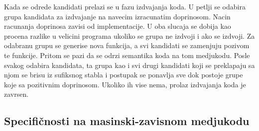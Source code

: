 \documentclass[12pt,oneside]{memoir}
\begin{document}

Kada se odrede kandidati prelazi se u fazu izdvajanja koda.
U petlji se odabira grupa kandidata za izdvajanje na navecim izracunatim doprinosom.
Nacin racunanja doprinosa zavisi od implementacije.
U oba slucaja se dobija kao procena razlike u velicini programa ukoliko se grupa ne izdvoji i ako se izdvoji.
Za odabranu grupu se generise nova funkcija, a svi kandidati se zamenjuju pozivom te funkcije.
Pritom se pazi da se odrzi semantika koda na tom medjukodu.
Posle svakog odabira kandidata, ta grupa kao i svi drugi kandidati koji se preklapaju sa njom se brisu iz sufiksnog stabla i postupak se ponavlja sve dok postoje grupe koje sa pozitivnim doprinosom.
Ukoliko ih vise nema, prolaz izdvajanja koda je zavrsen.






\subsection{Specifičnosti na masinski-zavisnom medjukodu}

\end{document}
